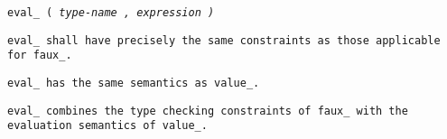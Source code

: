 
\tt{eval_ (} \it{type-name} \tt{,} \it{expression} \tt{)}


\tt{eval_} shall have precisely the same
constraints as those applicable for \tt{faux_}.


\tt{eval_} has the same semantics as \tt{value_}.

\note \tt{eval_} combines the type checking constraints of
\tt{faux_} with the evaluation semantics of \tt{value_}.
